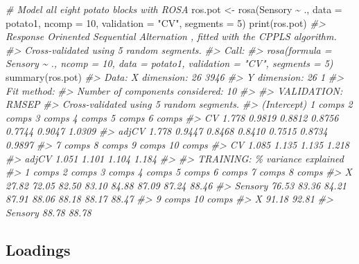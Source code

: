 \documentclass[
]{article}
\newenvironment{Shaded}{\begin{snugshade}}{\end{snugshade}}
\newcommand{\AttributeTok}[1]{\textcolor[rgb]{0.77,0.63,0.00}{#1}}
\newcommand{\CommentTok}[1]{\textcolor[rgb]{0.56,0.35,0.01}{\textit{#1}}}
\newcommand{\DecValTok}[1]{\textcolor[rgb]{0.00,0.00,0.81}{#1}}
\newcommand{\FunctionTok}[1]{\textcolor[rgb]{0.00,0.00,0.00}{#1}}
\newcommand{\NormalTok}[1]{#1}
\newcommand{\OtherTok}[1]{\textcolor[rgb]{0.56,0.35,0.01}{#1}}
\newcommand{\SpecialCharTok}[1]{\textcolor[rgb]{0.00,0.00,0.00}{#1}}
\newcommand{\StringTok}[1]{\textcolor[rgb]{0.31,0.60,0.02}{#1}}
\begin{document}
\begin{Shaded}
\begin{Highlighting}[]
\CommentTok{\# Model all eight potato blocks with ROSA}
\NormalTok{ros.pot }\OtherTok{\textless{}{-}} \FunctionTok{rosa}\NormalTok{(Sensory }\SpecialCharTok{\textasciitilde{}}\NormalTok{ ., }\AttributeTok{data =}\NormalTok{ potato1, }\AttributeTok{ncomp =} \DecValTok{10}\NormalTok{, }\AttributeTok{validation =} \StringTok{"CV"}\NormalTok{, }\AttributeTok{segments =} \DecValTok{5}\NormalTok{)}
\FunctionTok{print}\NormalTok{(ros.pot)}
\CommentTok{\#\textgreater{} Response Orinented Sequential Alternation , fitted with the CPPLS algorithm.}
\CommentTok{\#\textgreater{} Cross{-}validated using 5 random segments.}
\CommentTok{\#\textgreater{} Call:}
\CommentTok{\#\textgreater{} rosa(formula = Sensory \textasciitilde{} ., ncomp = 10, data = potato1, validation = "CV",     segments = 5)}
\FunctionTok{summary}\NormalTok{(ros.pot)}
\CommentTok{\#\textgreater{} Data:    X dimension: 26 3946 }
\CommentTok{\#\textgreater{}  Y dimension: 26 1}
\CommentTok{\#\textgreater{} Fit method:}
\CommentTok{\#\textgreater{} Number of components considered: 10}
\CommentTok{\#\textgreater{} }
\CommentTok{\#\textgreater{} VALIDATION: RMSEP}
\CommentTok{\#\textgreater{} Cross{-}validated using 5 random segments.}
\CommentTok{\#\textgreater{}        (Intercept)  1 comps  2 comps  3 comps  4 comps  5 comps  6 comps}
\CommentTok{\#\textgreater{} CV           1.778   0.9819   0.8812   0.8756   0.7744   0.9047   1.0309}
\CommentTok{\#\textgreater{} adjCV        1.778   0.9447   0.8468   0.8410   0.7515   0.8734   0.9897}
\CommentTok{\#\textgreater{}        7 comps  8 comps  9 comps  10 comps}
\CommentTok{\#\textgreater{} CV       1.085    1.135    1.135     1.218}
\CommentTok{\#\textgreater{} adjCV    1.051    1.101    1.104     1.184}
\CommentTok{\#\textgreater{} }
\CommentTok{\#\textgreater{} TRAINING: \% variance explained}
\CommentTok{\#\textgreater{}          1 comps  2 comps  3 comps  4 comps  5 comps  6 comps  7 comps  8 comps}
\CommentTok{\#\textgreater{} X          27.82    72.05    82.50    83.10    84.88    87.09    87.24    88.46}
\CommentTok{\#\textgreater{} Sensory    76.53    83.36    84.21    87.91    88.06    88.18    88.17    88.47}
\CommentTok{\#\textgreater{}          9 comps  10 comps}
\CommentTok{\#\textgreater{} X          91.18     92.81}
\CommentTok{\#\textgreater{} Sensory    88.78     88.78}
\end{Highlighting}
\end{Shaded}

\hypertarget{loadings-1}{%
\subsection{Loadings}\label{loadings-1}}
\end{document}

